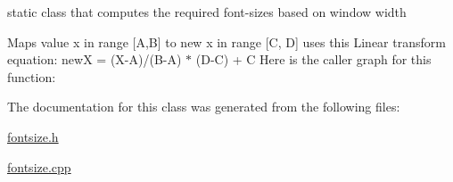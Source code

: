 static class that computes the required font-\/sizes based on window width 

Maps value x in range \mbox{[}A,B\mbox{]} to new x in range \mbox{[}C, D\mbox{]}  uses this Linear transform equation\+: newX = (X-\/A)/(B-\/A) $\ast$ (D-\/C) + C Here is the caller graph for this function\+:


The documentation for this class was generated from the following files\+:\begin{DoxyCompactItemize}
\item 
\mbox{\hyperlink{fontsize_8h}{fontsize.\+h}}\item 
\mbox{\hyperlink{fontsize_8cpp}{fontsize.\+cpp}}\end{DoxyCompactItemize}
